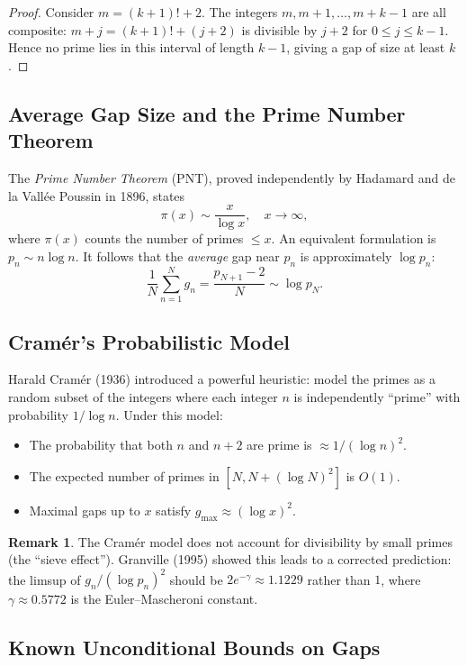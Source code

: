 \documentclass[12pt,a4paper]{amsart}
\theoremstyle{definition}
\newtheorem{remark}[theorem]{Remark}
\begin{document}
\begin{proof}
Consider $m = (k+1)! + 2$. The integers $m, m+1, \ldots, m+k-1$ are all
composite: $m+j = (k+1)! + (j+2)$ is divisible by $j+2$ for $0 \leq j \leq
k-1$. Hence no prime lies in this interval of length $k-1$, giving a gap of
size at least $k$.
\end{proof}

\subsection{Average Gap Size and the Prime Number Theorem}

The \emph{Prime Number Theorem} (PNT), proved independently by Hadamard and de la
Vall\'{e}e Poussin in 1896, states
\[
  \pi(x) \sim \frac{x}{\log x}, \quad x \to \infty,
\]
where $\pi(x)$ counts the number of primes $\leq x$. An equivalent formulation
is $p_n \sim n \log n$. It follows that the \emph{average} gap near $p_n$ is
approximately $\log p_n$:
\[
  \frac{1}{N} \sum_{n=1}^{N} g_n = \frac{p_{N+1} - 2}{N} \sim \log p_N.
\]

\subsection{Cram\'{e}r's Probabilistic Model}

Harald Cram\'{e}r (1936) introduced a powerful heuristic: model the primes as a
random subset of the integers where each integer $n$ is independently ``prime''
with probability $1/\log n$. Under this model:
\begin{itemize}
  \item The probability that both $n$ and $n + 2$ are prime is
        $\approx 1/(\log n)^2$.
  \item The expected number of primes in $[N, N + (\log N)^2]$ is $O(1)$.
  \item Maximal gaps up to $x$ satisfy $g_{\max} \approx (\log x)^2$.
\end{itemize}

\begin{remark}
The Cram\'{e}r model does not account for divisibility by small primes (the
``sieve effect''). Granville (1995) showed this leads to a corrected prediction:
the limsup of $g_n/(\log p_n)^2$ should be $2e^{-\gamma} \approx 1.1229$ rather
than $1$, where $\gamma \approx 0.5772$ is the Euler--Mascheroni constant.
\end{remark}

\subsection{Known Unconditional Bounds on Gaps}
\end{document}
